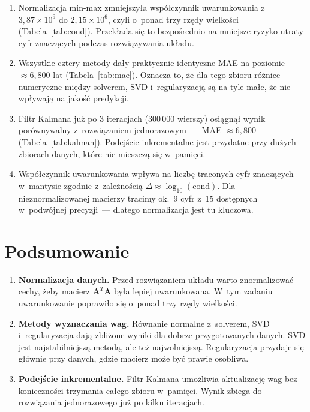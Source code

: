 \documentclass[12pt, a4paper]{article}
\begin{document}
\begin{enumerate}
  \item Normalizacja min-max zmniejszyła współczynnik uwarunkowania
        z~$3{,}87 \times 10^9$ do $2{,}15 \times 10^6$, czyli o~ponad
        trzy rzędy wielkości (Tabela~\ref{tab:cond}). Przekłada się to bezpośrednio
        na mniejsze ryzyko utraty cyfr znaczących podczas rozwiązywania układu.

  \item Wszystkie cztery metody dały praktycznie identyczne MAE na poziomie
        $\approx 6{,}800$ lat (Tabela~\ref{tab:mae}). Oznacza to, że dla
        tego zbioru różnice numeryczne między solverem, SVD i~regularyzacją
        są na tyle małe, że nie wpływają na jakość predykcji.

  \item Filtr Kalmana już po 3 iteracjach (300\,000 wierszy) osiągnął wynik
        porównywalny z~rozwiązaniem jednorazowym~--- MAE $\approx 6{,}800$
        (Tabela~\ref{tab:kalman}). Podejście inkrementalne jest przydatne
        przy dużych zbiorach danych, które nie mieszczą się w~pamięci.

  \item Współczynnik uwarunkowania wpływa na liczbę traconych cyfr znaczących
        w~mantysie zgodnie z~zależnością $\Delta \approx \log_{10}(\text{cond})$.
        Dla nieznormalizowanej macierzy tracimy ok.~9 cyfr z~15 dostępnych
        w~podwójnej precyzji~--- dlatego normalizacja jest tu kluczowa.
\end{enumerate}

\section{Podsumowanie}

\begin{enumerate}
  \item \textbf{Normalizacja danych.}
        Przed rozwiązaniem układu warto znormalizować cechy, żeby macierz
        $\mathbf{A}^T\mathbf{A}$ była lepiej uwarunkowana.
        W~tym zadaniu uwarunkowanie poprawiło się o~ponad trzy rzędy wielkości.

  \item \textbf{Metody wyznaczania wag.}
        Równanie normalne z~solverem, SVD i~regularyzacja dają zbliżone wyniki
        dla dobrze przygotowanych danych. SVD jest najstabilniejszą metodą,
        ale też najwolniejszą. Regularyzacja przydaje się głównie przy danych,
        gdzie macierz może być prawie osobliwa.

  \item \textbf{Podejście inkrementalne.}
        Filtr Kalmana umożliwia aktualizację wag bez konieczności trzymania
        całego zbioru w~pamięci. Wynik zbiega do rozwiązania jednorazowego
        już po kilku iteracjach.
\end{enumerate}
\end{document}

